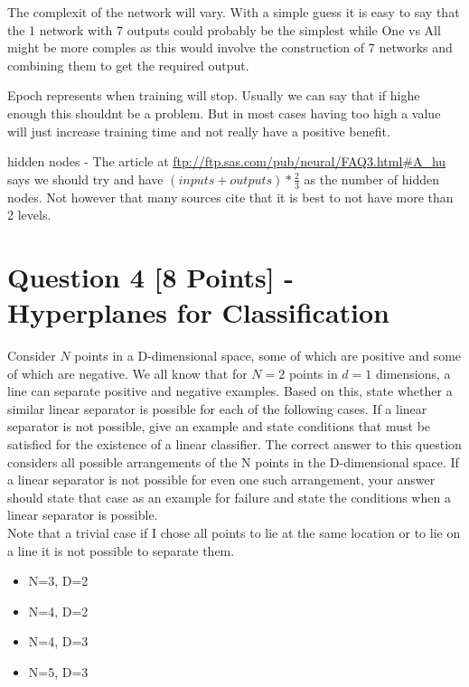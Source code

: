 \documentclass[fontsize=10pt,DIV=14]{scrartcl}
\begin{document}
\begin{enumerate}
		The complexit of the network will vary. With a simple guess it is easy to say that the 1 network with 7 outputs could probably be the simplest while One vs All might be more comples as this would involve the construction of 7 networks and combining them to get the required output.

		Epoch represents when training will stop. Usually we can say that if highe enough this shouldnt be a problem. But in most cases having too high a value will just increase training time and not really have a positive benefit.

		hidden nodes - The article at \url{ftp://ftp.sas.com/pub/neural/FAQ3.html#A_hu} says we should try and have $( inputs + outputs) * \frac{2}{3}$ as the number of hidden nodes. Not however that many sources cite that it is best to not have more than 2 levels.

	\end{enumerate}

	\section{Question 4 [8 Points] - Hyperplanes for Classification}

	Consider $N$ points in a D-dimensional space, some of which are positive and some of which are negative. We all know that for $N = 2$ points in $d = 1$ dimensions, a line can separate positive and negative examples. Based on this, state whether a similar linear separator is possible for each of the following cases. If a linear separator is not possible, give an example and state conditions that must be satisﬁed for the existence of a linear classiﬁer. The correct answer to this question considers all possible arrangements of the N points in the D-dimensional space. If a linear separator is not possible for even one such arrangement, your answer should state that case as an example for failure and state the conditions when a linear separator is possible. \\

	Note that a trivial case if I chose all points to lie at the same location or to lie on a line it is not possible to separate them.
	\begin{itemize}
		\item
		N=3, D=2

		\item
		N=4, D=2

		\item
		N=4, D=3

		\item
		N=5, D=3
	\end{itemize}
\end{document}
